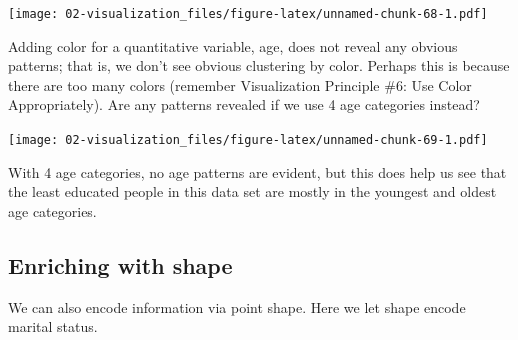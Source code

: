 \documentclass[
]{book}
\newenvironment{Shaded}{\begin{snugshade}}{\end{snugshade}}
\newcommand{\CommentTok}[1]{\textcolor[rgb]{0.56,0.35,0.01}{\textit{#1}}}
\newcommand{\DataTypeTok}[1]{\textcolor[rgb]{0.13,0.29,0.53}{#1}}
\newcommand{\DecValTok}[1]{\textcolor[rgb]{0.00,0.00,0.81}{#1}}
\newcommand{\KeywordTok}[1]{\textcolor[rgb]{0.13,0.29,0.53}{\textbf{#1}}}
\newcommand{\NormalTok}[1]{#1}
\newcommand{\OperatorTok}[1]{\textcolor[rgb]{0.81,0.36,0.00}{\textbf{#1}}}
\newcommand{\StringTok}[1]{\textcolor[rgb]{0.31,0.60,0.02}{#1}}
\begin{document}
\texttt{[image: 02-visualization\_files/figure-latex/unnamed-chunk-68-1.pdf]}

Adding color for a quantitative variable, age, does not reveal any obvious patterns; that is, we don't see obvious clustering by color. Perhaps this is because there are too many colors (remember Visualization Principle \#6: Use Color Appropriately). Are any patterns revealed if we use 4 age categories instead?

\begin{Shaded}
\end{Shaded}

\texttt{[image: 02-visualization\_files/figure-latex/unnamed-chunk-69-1.pdf]}

With 4 age categories, no age patterns are evident, but this does help us see that the least educated people in this data set are mostly in the youngest and oldest age categories.

\hypertarget{enriching-with-shape}{%
\subsection{Enriching with shape}\label{enriching-with-shape}}

We can also encode information via point shape. Here we let shape encode marital status.
\end{document}
